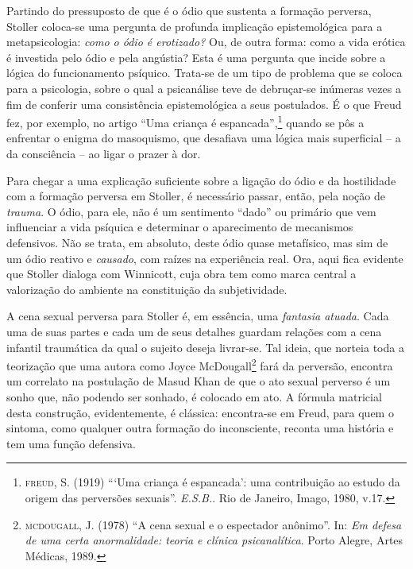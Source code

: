 Partindo do pressuposto de que é o ódio que sustenta a formação
perversa, Stoller coloca-se uma pergunta de profunda implicação
epistemológica para a metapsicologia: \emph{como o ódio é erotizado?}
Ou, de outra forma: como a vida erótica é investida pelo ódio e pela
angústia? Esta é uma pergunta que incide sobre a lógica do funcionamento
psíquico. Trata-se de um tipo de problema que se coloca para a
psicologia, sobre o qual a psicanálise teve de debruçar-se inúmeras
vezes a fim de conferir uma consistência epistemológica a seus
postulados. É o que Freud fez, por exemplo, no artigo ``Uma criança é
espancada'',\footnote{\textsc{freud}, S. (1919) ```Uma criança é
  espancada': uma contribuição ao estudo da origem das perversões
  sexuais''. \emph{E.S.B.}. Rio de Janeiro, Imago, 1980, v.17.} quando
se pôs a enfrentar o enigma do masoquismo, que desafiava uma lógica mais
superficial -- a da consciência -- ao ligar o prazer à dor.

Para chegar a uma explicação suficiente sobre a ligação do ódio e da
hostilidade com a formação perversa em Stoller, é necessário passar,
então, pela noção de \emph{trauma}. O ódio, para ele, não é um
sentimento ``dado'' ou primário que vem influenciar a vida psíquica e
determinar o aparecimento de mecanismos defensivos. Não se trata, em
absoluto, deste ódio quase metafísico, mas sim de um ódio reativo e
\emph{causado}, com raízes na experiência real. Ora, aqui fica evidente
que Stoller dialoga com Winnicott, cuja obra tem como marca central a
valorização do ambiente na constituição da subjetividade.

A cena sexual perversa para Stoller é, em essência, uma \emph{fantasia
atuada}. Cada uma de suas partes e cada um de seus detalhes guardam
relações com a cena infantil traumática da qual o sujeito deseja
livrar-se. Tal ideia, que norteia toda a teorização que uma autora como
Joyce McDougall\footnote{\textsc{mcdougall}, J. (1978) ``A cena sexual e
  o espectador anônimo''. In: \emph{Em defesa de uma certa anormalidade:
  teoria e clínica psicanalítica}. Porto Alegre, Artes Médicas, 1989.}
fará da perversão, encontra um correlato na postulação de Masud Khan de
que o ato sexual perverso é um sonho que, não podendo ser sonhado, é
colocado em ato. A fórmula matricial desta construção, evidentemente, é
clássica: encontra-se em Freud, para quem o sintoma, como qualquer outra
formação do inconsciente, reconta uma história e tem uma função
defensiva.

